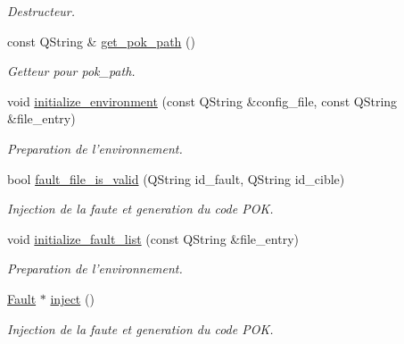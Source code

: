 \begin{DoxyCompactItemize}
\begin{DoxyCompactList}\small\item\em Destructeur. \item\end{DoxyCompactList}\item 
const QString \& \hyperlink{classInjector_aefc25309339e5aacf78355e4a6a45d18}{get\_\-pok\_\-path} ()
\begin{DoxyCompactList}\small\item\em Getteur pour pok\_\-path. \item\end{DoxyCompactList}\item 
void \hyperlink{classInjector_a097acccd64ff95a0763d99c51a7ab2e7}{initialize\_\-environment} (const QString \&config\_\-file, const QString \&file\_\-entry)
\begin{DoxyCompactList}\small\item\em Preparation de l'environnement. \item\end{DoxyCompactList}\item 
bool \hyperlink{classInjector_a2dab7e4a6ff7daef39596f64ad76ee5e}{fault\_\-file\_\-is\_\-valid} (QString id\_\-fault, QString id\_\-cible)
\begin{DoxyCompactList}\small\item\em Injection de la faute et generation du code POK. \item\end{DoxyCompactList}\item 
void \hyperlink{classInjector_ae4a9416054f13e1a5c84c475ae4670d2}{initialize\_\-fault\_\-list} (const QString \&file\_\-entry)
\begin{DoxyCompactList}\small\item\em Preparation de l'environnement. \item\end{DoxyCompactList}\item 
\hyperlink{classFault}{Fault} $\ast$ \hyperlink{classInjector_ae60e299c7e4e5cfc2537ddb0a8a56358}{inject} ()
\begin{DoxyCompactList}\small\item\em Injection de la faute et generation du code POK. \item\end{DoxyCompactList}\end{DoxyCompactItemize}



